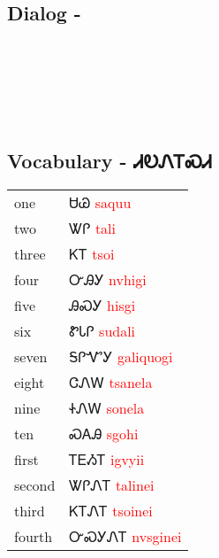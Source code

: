 \subsection{Dialog - }
\begin{tabular}{p{2cm} p{11cm}}
\end{tabular}
\\
\\
\\
\noindent\begin{tabular}{p{2cm} p{11cm}}\end{tabular}
\subsection{Vocabulary - ᏗᎧᏁᎢᏍᏗ 
}
\begin{tabular}{p{3cm} p{11cm}}
one & ᏌᏊ 
 \newline \textcolor{red}{saquu}\\
two & ᏔᎵ 
 \newline \textcolor{red}{tali}\\
three & ᏦᎢ 
 \newline \textcolor{red}{tsoi}\\
four & ᏅᎯᎩ 
 \newline \textcolor{red}{nvhigi}\\
five & ᎯᏍᎩ 
 \newline \textcolor{red}{hisgi}\\
six & ᏑᏓᎵ 
 \newline \textcolor{red}{sudali}\\
seven & ᎦᎵᏉᎩ 
 \newline \textcolor{red}{galiquogi}\\
eight & ᏣᏁᎳ 
 \newline \textcolor{red}{tsanela}\\
nine & ᏐᏁᎳ 
 \newline \textcolor{red}{sonela}\\
ten & ᏍᎪᎯ 
 \newline \textcolor{red}{sgohi}\\
first & ᎢᎬᏱᎢ 
 \newline \textcolor{red}{igvyii}\\
second & ᏔᎵᏁᎢ 
 \newline \textcolor{red}{talinei}\\
third & ᏦᎢᏁᎢ 
 \newline \textcolor{red}{tsoinei}\\
fourth & ᏅᏍᎩᏁᎢ 
 \newline \textcolor{red}{nvsginei}\\

\end{tabular}
